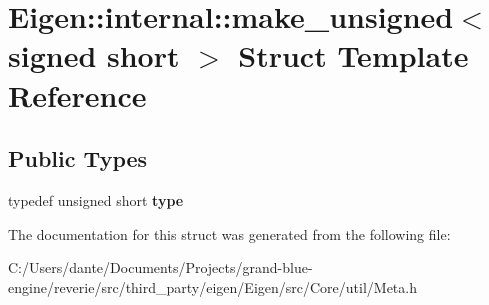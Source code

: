 \hypertarget{struct_eigen_1_1internal_1_1make__unsigned_3_01signed_01short_01_4}{}\section{Eigen\+::internal\+::make\+\_\+unsigned$<$ signed short $>$ Struct Template Reference}
\label{struct_eigen_1_1internal_1_1make__unsigned_3_01signed_01short_01_4}
\subsection*{Public Types}
\begin{DoxyCompactItemize}
\item 
\mbox{\label{struct_eigen_1_1internal_1_1make__unsigned_3_01signed_01short_01_4_a14b26640cdff975eb82863ee3a18efaf}} 
typedef unsigned short {\bfseries type}
\end{DoxyCompactItemize}


The documentation for this struct was generated from the following file\+:\begin{DoxyCompactItemize}
\item 
C\+:/\+Users/dante/\+Documents/\+Projects/grand-\/blue-\/engine/reverie/src/third\+\_\+party/eigen/\+Eigen/src/\+Core/util/Meta.\+h\end{DoxyCompactItemize}
